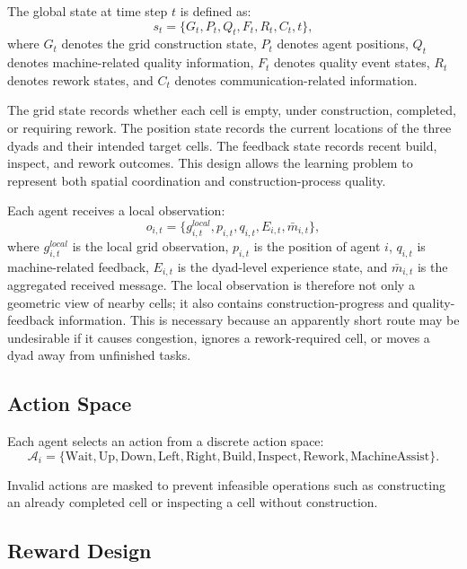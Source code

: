 \documentclass[preprint,12pt]{elsarticle}
\begin{document}
The global state at time step $t$ is defined as:
\begin{equation}
s_t = \{G_t, P_t, Q_t, F_t, R_t, C_t, t\},
\end{equation}
where $G_t$ denotes the grid construction state, $P_t$ denotes agent positions, $Q_t$ denotes machine-related quality information, $F_t$ denotes quality event states, $R_t$ denotes rework states, and $C_t$ denotes communication-related information.

The grid state records whether each cell is empty, under construction, completed, or requiring rework. The position state records the current locations of the three dyads and their intended target cells. The feedback state records recent build, inspect, and rework outcomes. This design allows the learning problem to represent both spatial coordination and construction-process quality.

Each agent receives a local observation:
\begin{equation}
o_{i,t} =
\{g^{local}_{i,t}, p_{i,t}, q_{i,t}, E_{i,t}, \bar{m}_{i,t}\},
\end{equation}
where $g^{local}_{i,t}$ is the local grid observation, $p_{i,t}$ is the position of agent $i$, $q_{i,t}$ is machine-related feedback, $E_{i,t}$ is the dyad-level experience state, and $\bar{m}_{i,t}$ is the aggregated received message. The local observation is therefore not only a geometric view of nearby cells; it also contains construction-progress and quality-feedback information. This is necessary because an apparently short route may be undesirable if it causes congestion, ignores a rework-required cell, or moves a dyad away from unfinished tasks.

\subsection{Action Space}

Each agent selects an action from a discrete action space:
\begin{equation}
\mathcal{A}_i =
\{\text{Wait}, \text{Up}, \text{Down}, \text{Left}, \text{Right},
\text{Build}, \text{Inspect}, \text{Rework}, \text{MachineAssist}\}.
\end{equation}

Invalid actions are masked to prevent infeasible operations such as constructing an already completed cell or inspecting a cell without construction.

\subsection{Reward Design}
\end{document}
